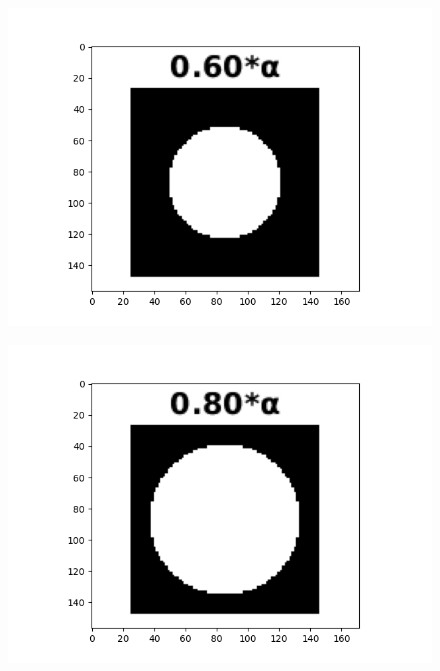 \documentclass[12pt, a4paper]{article}
\begin{document}
\begin{figure}[h!]
\begin{minipage}[c][1\width]{0.19\textwidth}
		\hspace*{-14pt}    	
    	\includegraphics[width=1.24\textwidth]{bird_kernel_0.60_cropped.png}
	    \label{fig:3.5(a)}
	    \vspace*{-23pt}
	    \caption{}
    \end{minipage}
    \begin{minipage}[c][1\width]{0.19\textwidth}
    	\hspace*{-14pt}
    	\includegraphics[width=1.24\textwidth]{bird_kernel_0.80_cropped.png}
	    \label{fig:3.5(a)}
    \end{minipage}
    \begin{minipage}[c][1\width]{0.19\textwidth}
    	\hspace*{-14pt}

\end{minipage}
\end{figure}
\end{document}
